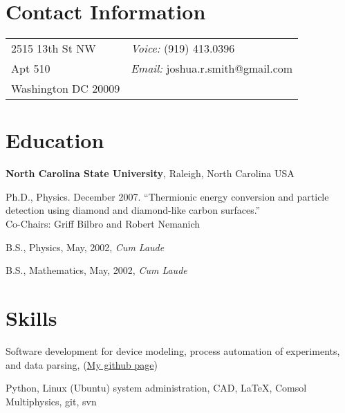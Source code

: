 \documentclass[letterpaper,margin,line]{res}
\newenvironment{list1}{
  \begin{list}{\ding{113}}{%
      \setlength{\itemsep}{0in}
      \setlength{\parsep}{0in} \setlength{\parskip}{0in}
      \setlength{\topsep}{0in} \setlength{\partopsep}{0in} 
      \setlength{\leftmargin}{0.17in}}}{\end{list}}
\begin{document}

\begin{resume}
\section{\sc Contact Information}
\vspace{.05in}
\begin{tabular}{@{}p{2in}p{4in}}
2515 13th St NW     & {\it Voice:} (919) 413.0396\\
Apt 510             & {\it Email:} {joshua.r.smith@gmail.com} \\
Washington DC 20009 & 
\end{tabular}


\section{\sc Education}

{\bf North Carolina State University}, Raleigh, North Carolina USA\\
\vspace*{-.1in}
\begin{list1}
\item[] Ph.D., Physics. December 2007. ``Thermionic energy conversion and particle detection using diamond and diamond-like carbon surfaces.'' \\Co-Chairs: Griff Bilbro and Robert Nemanich
\item[] B.S., Physics,  May, 2002, \textit{Cum Laude}
\item[] B.S., Mathematics, May, 2002, \textit{Cum Laude}
\end{list1}



\section{\sc Skills}
Software development for device modeling, process automation of experiments, and data parsing, (\href{https://github.com/jrsmith3}{My github page})

\vspace*{-2.5mm}
Python, Linux (Ubuntu) system administration, CAD, \LaTeX, Comsol Multiphysics, git, svn


\end{resume}
\end{document}
